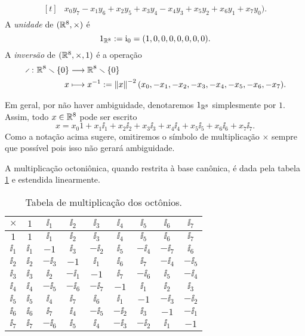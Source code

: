 \begin{definition}
\begin{align*}
{\begin{aligned}[t]
				&x_0y_7 - x_1y_6 + x_2y_5 + x_3y_4 - x_4y_3 + x_5y_2 + x_6y_1 + x_7y_0) .
		\end{aligned}
	}
	\end{align*}
A \emph{unidade} de $(\mathbb{R}^8,\times)$ é
	\begin{equation*}
	1_{\mathbb{R}^8} := \mathrm{i}_0 = (1,0,0,0,0,0,0,0).
	\end{equation*}
A \emph{inversão} de $(\mathbb{R}^8,\times,1)$ é a operação
	\begin{align*}
	\func{\div}{\R^8 \setminus \{0\}}{\R^8 \setminus \{0\}}{x}{x\inv := \nor{x}^{-2} (x_0, -x_1, -x_2, -x_3, -x_4, -x_5, -x_6, -x_7)}.
	\end{align*}
\end{definition}

Em geral, por não haver ambiguidade, denotaremos $1_{\mathbb{R}^8}$ simplesmente por $1$. Assim, todo $x \in \mathbb{R}^8$ pode ser escrito
	\begin{equation*}
	x = x_0 1 + x_1\ii_1 + x_2\ii_2 + x_3\ii_3 + x_4\ii_4 + x_5\ii_5 + x_6\ii_6 + x_7\ii_7.
	\end{equation*}
Como a notação acima sugere, omitiremos o símbolo de multiplicação $\times$ sempre que possível pois isso não gerará ambiguidade.

A multiplicação octoniônica, quando restrita à base canônica, é dada pela tabela \ref{tab:multiplicacao.octonionica} e estendida linearmente.

\begin{table}
	\centering

	\begin{tabular}{c | c c c c c c c c}
	\toprule
	$\times$&	$1$		&	$\ii_1$	&	$\ii_2$	&	$\ii_3$	&	$\ii_4$	&	$\ii_5$	&	$\ii_6$	&	$\ii_7$		\\
	\hline
	$1$		&	$1$		&	$\ii_1$	&	$\ii_2$	&	$\ii_3$	&	$\ii_4$	&	$\ii_5$	&	$\ii_6$	&	$\ii_7$		\\
	$\ii_1$	&	$\ii_1$	&	$-1$	&	$\ii_3$	&	$-\ii_2$&	$\ii_5$	&	$-\ii_4$&	$-\ii_7$&	$\ii_6$		\\
	$\ii_2$	&	$\ii_2$	&	$-\ii_3$&	$-1$	&	$\ii_1$	&	$\ii_6$	&	$\ii_7$	&	$-\ii_4$&	$-\ii_5$	\\
	$\ii_3$	&	$\ii_3$	&	$\ii_2$	&	$-\ii_1$&	$-1$	&	$\ii_7$	&	$-\ii_6$&	$\ii_5$	&	$-\ii_4$	\\
	$\ii_4$	&	$\ii_4$	&	$-\ii_5$&	$-\ii_6$&	$-\ii_7$&	$-1$	&	$\ii_1$	&	$\ii_2$	&	$\ii_3$		\\
	$\ii_5$	&	$\ii_5$	&	$\ii_4$	&	$\ii_7$	&	$\ii_6$	&	$\ii_1$	&	$-1$	&	$-\ii_3$&	$-\ii_2$	\\
	$\ii_6$	&	$\ii_6$	&	$\ii_7$	&	$\ii_4$	&	$-\ii_5$&	$-\ii_2$&	$\ii_3$	&	$-1$	&	$-\ii_1$	\\
	$\ii_7$	&	$\ii_7$	&	$-\ii_6$&	$\ii_5$	&	$\ii_4$	&	$-\ii_3$&	$-\ii_2$&	$\ii_1$	&	$-1$		\\
	\bottomrule
	\end{tabular}

	\caption{Tabela de multiplicação dos octônios.}
	\label{tab:multiplicacao.octonionica}
\end{table}

